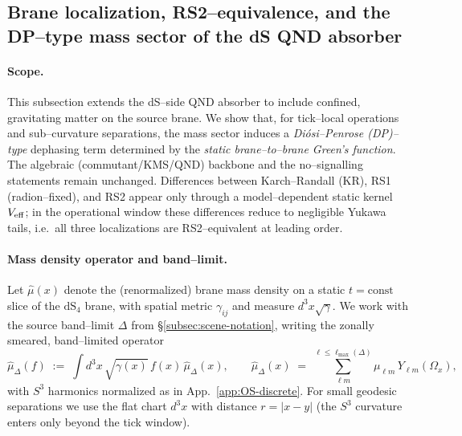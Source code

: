 \documentclass[10pt]{article}
\theoremstyle{definition}
\theoremstyle{plain}
\begin{document}
\subsection{Brane localization, RS2--equivalence, and the DP--type mass sector of the dS QND absorber}
\label{app:brane-localization-dp}

\paragraph{Scope.}\label{par:uom-main-223}
This subsection extends the dS--side QND absorber to include confined, gravitating matter on the source brane. We show that, for tick--local operations and sub–curvature separations, the mass sector induces a \emph{Diósi–Penrose (DP)–type} dephasing term determined by the \emph{static brane--to--brane Green's function}. The algebraic (commutant/KMS/QND) backbone and the no–signalling statements remain unchanged. Differences between Karch--Randall (KR), RS1 (radion--fixed), and RS2 appear only through a model--dependent static kernel \(V_{\rm eff}\); in the operational window these differences reduce to negligible Yukawa tails, i.e.\ all three localizations are RS2--equivalent at leading order.

\paragraph{Mass density operator and band--limit.}\label{par:uom-main-224}
Let \(\hat\mu(x)\) denote the (renormalized) brane mass density on a static \(t=\mathrm{const}\) slice of the \(\mathrm{dS}_4\) brane, with spatial metric \(\gamma_{ij}\) and measure \(d^3x\sqrt{\gamma}\).
We work with the source band--limit \(\Delta\) from \S\ref{subsec:scene-notation}, writing the zonally smeared, band--limited operator
\[
\hat\mu_\Delta(f)\;:=\;\int d^3x\,\sqrt{\gamma(x)}\,f(x)\,\hat\mu_\Delta(x),\qquad
\hat\mu_\Delta(x)\;=\;\sum_{\ell m}^{\ell\le \ell_{\max}(\Delta)} \mu_{\ell m}\,Y_{\ell m}(\Omega_x),
\]
with \(S^3\) harmonics normalized as in App.~\ref{app:OS-discrete}. For small geodesic separations we use the flat chart \(d^3x\) with distance \(r=|x-y|\) (the \(S^3\) curvature enters only beyond the tick window).
\end{document}

